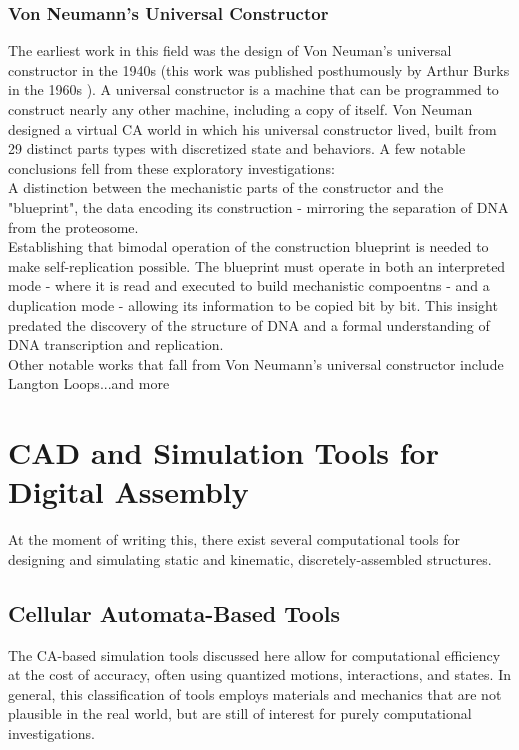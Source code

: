 {\subsubsection{Von Neumann's Universal Constructor}

The earliest work in this field was the design of Von Neuman's universal constructor in the 1940s (this work was published posthumously by Arthur Burks in the 1960s \cite{Burks1969}).  A universal constructor is a machine that can be programmed to construct nearly any other machine, including a copy of itself.  Von Neuman designed a virtual CA world in which his universal constructor lived, built from 29 distinct parts types with discretized state and behaviors.  A few notable conclusions fell from these exploratory investigations:\\

A distinction between the mechanistic parts of the constructor and the "blueprint", the data encoding its construction - mirroring the separation of DNA from the proteosome.\\
Establishing that bimodal operation of the construction blueprint is needed to make self-replication possible.  The blueprint must operate in both an interpreted mode - where it is read and executed to build mechanistic compoentns - and a duplication mode - allowing its information to be copied bit by bit.  This insight predated the discovery of the structure of DNA and a formal understanding of DNA transcription and replication.\\

Other notable works that fall from Von Neumann's universal constructor include Langton Loops\cite{}...and more

\section{CAD and Simulation Tools for Digital Assembly}

At the moment of writing this, there exist several computational tools for designing and simulating static and kinematic, discretely-assembled structures.

\subsection{Cellular Automata-Based Tools}

The CA-based simulation tools discussed here allow for computational efficiency at the cost of accuracy, often using quantized motions, interactions, and states.  In general, this classification of tools employs materials and mechanics that are not plausible in the real world, but are still of interest for purely computational investigations.\\

}
